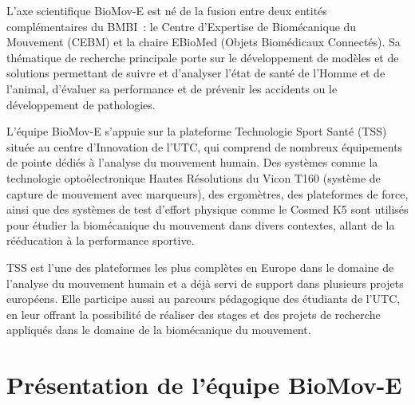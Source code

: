     L'axe scientifique BioMov-E est né de la fusion entre deux entités complémentaires du BMBI : le Centre d'Expertise de Biomécanique du Mouvement (CEBM) et la chaire EBioMed (Objets Biomédicaux Connectés). Sa thématique de recherche principale porte sur le développement de modèles et de solutions permettant de suivre et d'analyser l'état de santé de l'Homme et de l'animal, d'évaluer sa performance et de prévenir les accidents ou le développement de pathologies.
    
    L'équipe BioMov-E s'appuie sur la plateforme Technologie Sport Santé (TSS) située au centre d'Innovation de l'UTC, qui comprend de nombreux équipements de pointe dédiés à l'analyse du mouvement humain. Des systèmes comme la technologie optoélectronique Hautes Résolutions du Vicon T160 (système de capture de mouvement avec marqueurs), des ergomètres, des plateformes de force, ainsi que des systèmes de test d’effort physique comme le Cosmed K5 sont utilisés pour étudier la biomécanique du mouvement dans divers contextes, allant de la rééducation à la performance sportive.

    TSS est l'une des plateformes les plus complètes en Europe dans le domaine de l'analyse du mouvement humain et a déjà servi de support dans plusieurs projets européens. Elle participe aussi au parcours pédagogique des étudiants de l'UTC, en leur offrant la possibilité de réaliser des stages et des projets de recherche appliqués dans le domaine de la biomécanique du mouvement. 

\section{Présentation de l'équipe BioMov-E}

